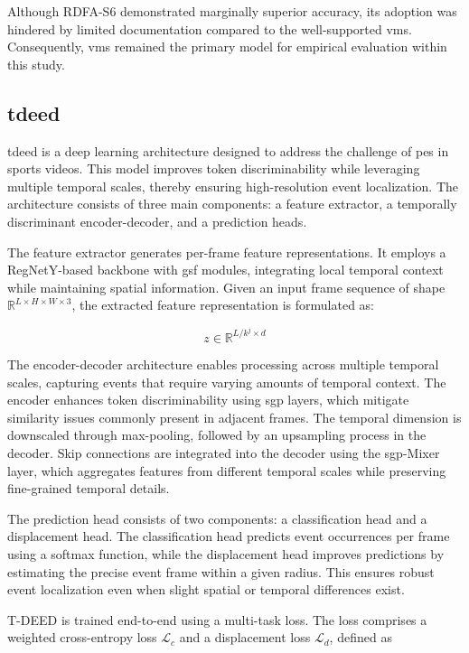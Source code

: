 Although RDFA-S6 demonstrated marginally superior accuracy, its adoption was hindered by limited documentation compared to the well-supported \acrlong{vms}. Consequently, \acrshort{vms} remained the primary model for empirical evaluation within this study. 


\subsection{\acrfull{tdeed}}
\label{ssec:tdeed}

\acrfull{tdeed} is a deep learning architecture designed to address the challenge of \acrfull{pes} in sports videos. This model improves token discriminability while leveraging multiple temporal scales, thereby ensuring high-resolution event localization. The architecture consists of three main components: a feature extractor, a temporally discriminant encoder-decoder, and a prediction heads\cite{xarles_t-deed_2024}.

The feature extractor generates per-frame feature representations. It employs a RegNetY-based backbone with \acrfull{gsf} modules, integrating local temporal context while maintaining spatial information. Given an input frame sequence of shape \(\mathbb{R}^{L \times H \times W \times 3}\), the extracted feature representation is formulated as:

\[
z \in \mathbb{R}^{L/{k^j \times d} }
\]

The encoder-decoder architecture enables processing across multiple temporal scales, capturing events that require varying amounts of temporal context. The encoder enhances token discriminability using \acrfull{sgp} layers, which mitigate similarity issues commonly present in adjacent frames. The temporal dimension is downscaled through max-pooling, followed by an upsampling process in the decoder. Skip connections are integrated into the decoder using the \acrshort{sgp}-Mixer layer, which aggregates features from different temporal scales while preserving fine-grained temporal details.

The prediction head consists of two components: a classification head and a displacement head. The classification head predicts event occurrences per frame using a softmax function, while the displacement head improves predictions by estimating the precise event frame within a given radius. This ensures robust event localization even when slight spatial or temporal differences exist.


T-DEED is trained end-to-end using a multi-task loss. The loss comprises a weighted cross-entropy loss \(\mathcal{L}_c\) and a displacement loss \(\mathcal{L}_d\), defined as

